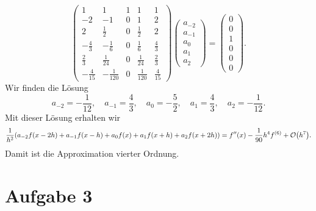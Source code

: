 \documentclass{exercise}
\begin{document}
    \[
        \begin{pmatrix}
            1 & 1 & 1 & 1 & 1\\
            -2 & -1 & 0 & 1 & 2\\
            2 & \frac{1}{2} & 0 & \frac{1}{2} & 2\\
            -\frac{4}{3} & -\frac{1}{6} & 0 & \frac{1}{6} & \frac{4}{3}\\
            \frac{2}{3} & \frac{1}{24} & 0 & \frac{1}{24} & \frac{2}{3}\\
            -\frac{4}{15} & -\frac{1}{120} & 0 & \frac{1}{120} & \frac{4}{15}
        \end{pmatrix}\begin{pmatrix}
            a_{-2}\\a_{-1}\\a_0\\a_1\\a_2
        \end{pmatrix} = \begin{pmatrix}
            0\\0\\1\\0\\0\\0
        \end{pmatrix}.
    \]
    Wir finden die Lösung
    \[
        a_{-2} = -\frac{1}{12}, \quad a_{-1} = \frac{4}{3}, \quad a_0 = -\frac{5}{2}, \quad a_1 = \frac{4}{3}, \quad a_2 = -\frac{1}{12}.
    \]
    Mit dieser Lösung erhalten wir
    \[
        \frac{1}{h^2}\parentheses*{a_{-2}f\parentheses*{x - 2h} + a_{-1}f\parentheses*{x - h} + a_0 f\parentheses*{x} + a_1 f\parentheses*{x + h} + a_2 f\parentheses*{x + 2h}} = f''\parentheses*{x} - \frac{1}{90}h^4 f^{\parentheses*{6}} + \mathcal{O}\parentheses*{h^7}.
    \]
    Damit ist die Approximation vierter Ordnung.


    \section*{Aufgabe 3}
\end{document}
